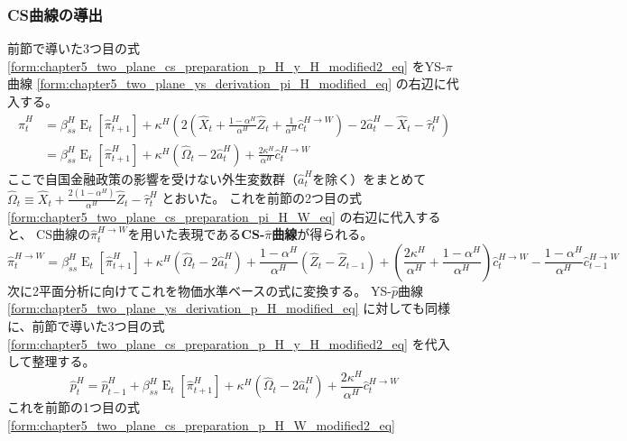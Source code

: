 \subsubsection{CS曲線の導出}
\label{sec:chapter5_two_plane_cs_derivation}
前節で導いた3つ目の式
\eqref{form:chapter5_two_plane_cs_preparation_p_H_y_H_modified2_eq}
をYS-\(\pi\)曲線
\eqref{form:chapter5_two_plane_ys_derivation_pi_H_modified_eq}
の右辺に代入する。
\begin{equation}
\label{form:chapter5_two_plane_cs_derivation_pi_H_eq}
\begin{aligned}
    \hat{\pi}_t^H
    &=\beta_{ss}^H\operatorname{E}_t[\hat{\pi}_{t+1}^H]+\kappa^H\left(2\left(\hat{X}_t+\frac{1-\alpha^H}{\alpha^H}\hat{Z}_t+\frac{1}{\alpha^H}\hat{c}_t^{H\to W}\right)-2\hat{a}_t^H-\hat{X}_t-\hat{\tau}_t^H\right) \\
    &=\beta_{ss}^H\operatorname{E}_t[\hat{\pi}_{t+1}^H]+\kappa^H(\hat{\Omega}_t-2\hat{a}_t^H)+\frac{2\kappa^H}{\alpha^H}\hat{c}_t^{H\to W}
\end{aligned}
\end{equation}
ここで自国金融政策の影響を受けない外生変数群（\(\hat{a}_t^H\)を除く）をまとめて
\(\hat{\Omega}_t\equiv\hat{X}_t+\frac{2(1-\alpha^H)}{\alpha^H}\hat{Z}_t-\hat{\tau}_t^H\)
とおいた。
これを前節の2つ目の式
\eqref{form:chapter5_two_plane_cs_preparation_pi_H_W_eq}
の右辺に代入すると、
CS曲線の\(\hat{\pi}_t^{H\to W}\)を用いた表現である\textbf{CS-\(\hat{\pi}\)曲線}が得られる。
\begin{equation}
\label{form:chapter5_two_plane_cs_derivation_pi_H_W_modified_eq}
    \hat{\pi}_t^{H\to W}=\beta_{ss}^H\operatorname{E}_t[\hat{\pi}_{t+1}^H]+\kappa^H(\hat{\Omega}_t-2\hat{a}_t^H)+\frac{1-\alpha^H}{\alpha^H}(\hat{Z}_t-\hat{Z}_{t-1})+\left(\frac{2\kappa^H}{\alpha^H}+\frac{1-\alpha^H}{\alpha^H}\right)\hat{c}_t^{H\to W}-\frac{1-\alpha^H}{\alpha^H}\hat{c}_{t-1}^{H\to W}
\end{equation}
次に2平面分析に向けてこれを物価水準ベースの式に変換する。
YS-\(\hat{p}\)曲線
\eqref{form:chapter5_two_plane_ys_derivation_p_H_modified_eq}
に対しても同様に、前節で導いた3つ目の式
\eqref{form:chapter5_two_plane_cs_preparation_p_H_y_H_modified2_eq}
を代入して整理する。
\begin{equation}
\label{form:chapter5_two_plane_cs_derivation_p_H_eq}
    \hat{p}_t^H=\hat{p}_{t-1}^H+\beta_{ss}^H\operatorname{E}_t[\hat{\pi}_{t+1}^H]+\kappa^H(\hat{\Omega}_t-2\hat{a}_t^H)+\frac{2\kappa^H}{\alpha^H}\hat{c}_t^{H\to W}
\end{equation}
これを前節の1つ目の式
\eqref{form:chapter5_two_plane_cs_preparation_p_H_W_modified2_eq}
